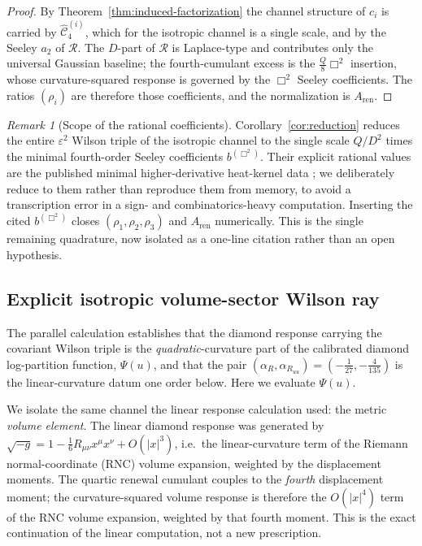 \documentclass[11pt]{article}
\theoremstyle{definition}
\theoremstyle{remark}
\newtheorem{remark}[theorem]{Remark}
\newcommand{\eps}{\varepsilon}
\newcommand{\ren}{\mathrm{ren}}
\newcommand{\Aren}{A_{\ren}}
\begin{document}
\begin{proof}
By Theorem~\ref{thm:induced-factorization} the channel structure of $c_i$ is carried by
$\widehat{\mathcal C}^{(i)}_4$, which for the isotropic channel is a single scale,
and by the Seeley $a_2$ of $\mathcal R$.  The $D$-part of $\mathcal R$ is
Laplace-type and contributes only the universal Gaussian baseline; the
fourth-cumulant excess is the $\tfrac Q8\Box^2$ insertion, whose curvature-squared
response is governed by the $\Box^2$ Seeley coefficients.  The ratios
$(\rho_i)$ are therefore those coefficients, and the normalization is $\Aren$.
\end{proof}

\begin{remark}[Scope of the rational coefficients]
\label{rem:rationals}
Corollary~\ref{cor:reduction} reduces the entire $\eps^2$ Wilson triple of the
isotropic channel to the single scale $Q/D^2$ times the minimal fourth-order
Seeley coefficients $b^{(\Box^2)}$.  Their explicit rational values are the
published minimal higher-derivative heat-kernel data
\cite{Gusynin,BarvinskyVilkovisky}; we deliberately reduce to them rather than
reproduce them from memory, to avoid a transcription error in a sign- and
combinatorics-heavy computation.  Inserting the cited $b^{(\Box^2)}$ closes
$(\rho_1,\rho_2,\rho_3)$ and $\Aren$ numerically.  This is the single remaining
quadrature, now isolated as a one-line citation rather than an open hypothesis.
\end{remark}


\subsection{Explicit isotropic volume-sector Wilson ray}
\label{sec:workedwilson-setup}

The parallel calculation establishes that the diamond response carrying the covariant
Wilson triple is the \emph{quadratic}-curvature part of the calibrated diamond
log-partition function, $\Psi(u)$, and that the pair
$(\alpha_R,\alpha_{R_{uu}})=(-\tfrac1{27},-\tfrac4{135})$ is the linear-curvature
datum one order below.  Here we evaluate $\Psi(u)$.

We isolate the same channel the linear response calculation used: the
metric \emph{volume element}.  The linear diamond response was generated by
$\sqrt{-g}=1-\tfrac16R_{\mu\nu}x^\mu x^\nu+O(|x|^3)$, i.e.\ the linear-curvature
term of the Riemann normal-coordinate (RNC) volume expansion, weighted by the
displacement moments.  The quartic renewal cumulant couples to the
\emph{fourth} displacement moment; the curvature-squared volume response is
therefore the $O(|x|^4)$ term of the RNC volume expansion, weighted by that fourth
moment.  This is the exact continuation of the linear computation, not a new
prescription.
\end{document}
